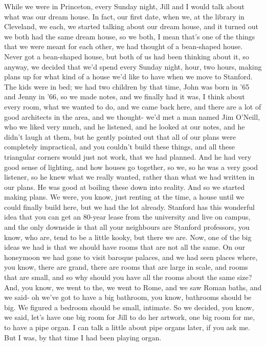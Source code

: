 \documentclass[]{article}
\begin{document}
While we were in Princeton, every Sunday night, Jill and I would talk
about what was our dream house. In fact, our first date, when we, at the
library in Cleveland, we each, we started talking about our dream house,
and it turned out we both had the same dream house, so we both, I mean
that's one of the things that we were meant for each other, we had
thought of a bean-shaped house. Never got a bean-shaped house, but both
of us had been thinking about it, so anyway, we decided that we'd spend
every Sunday night, hour, two hours, making plans up for what kind of a
house we'd like to have when we move to Stanford. The kids were in bed;
we had two children by that time, John was born in '65 and Jenny in '66,
so we made notes, and we finally had it was, I think about every room,
what we wanted to do, and we came back here, and there are a lot of good
architects in the area, and we thought- we'd met a man named Jim
O'Neill, who we liked very much, and he listened, and he looked at our
notes, and he didn't laugh at them, but he gently pointed out that all
of our plans were completely impractical, and you couldn't build these
things, and all these triangular corners would just not work, that we
had planned. And he had very good sense of lighting, and how houses go
together, so we, so he was a very good listener, so he knew what we
really wanted, rather than what we had written in our plans. He was good
at boiling these down into reality. And so we started making plans. We
were, you know, just renting at the time, a house until we could finally
build here, but we had the lot already. Stanford has this wonderful idea
that you can get an 80-year lease from the university and live on
campus, and the only downside is that all your neighbours are Stanford
professors, you know, who are, tend to be a little kooky, but there we
are. Now, one of the big ideas we had is that we should have rooms that
are not all the same. On our honeymoon we had gone to visit baroque
palaces, and we had seen places where, you know, there are grand, there
are rooms that are large in scale, and rooms that are small, and so why
should you have all the rooms about the same size? And, you know, we
went to the, we went to Rome, and we saw Roman baths, and we said- oh
we've got to have a big bathroom, you know, bathrooms should be big. We
figured a bedroom should be small, intimate. So we decided, you know, we
said, let's have one big room for Jill to do her artwork, one big room
for me, to have a pipe organ. I can talk a little about pipe organs
later, if you ask me. But I was, by that time I had been playing organ.
\end{document}
